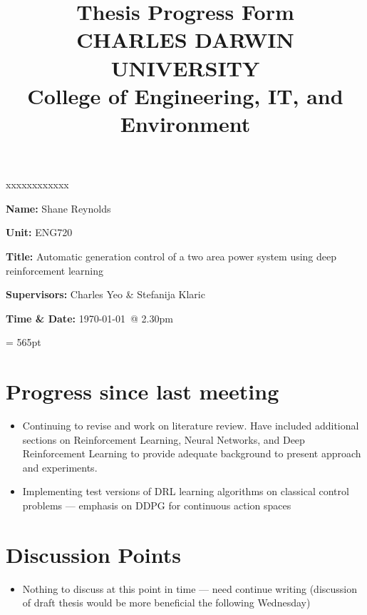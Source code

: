 \documentclass[12pt]{article}
\title{	
		Thesis Progress Form\\
		CHARLES DARWIN UNIVERSITY\\
		College of Engineering, IT, and Environment
	  }
\author{}
\date{}
\begin{document}
	
	\maketitle
	
	\begin{namelist}{xxxxxxxxxxxx}
		\item[{\bf Name:}]
			Shane Reynolds
		\item[{\bf Unit:}]
			ENG720
		\item[{\bf Title:}]
			Automatic generation control of a two area power system using deep reinforcement learning
		\item[{\bf Supervisors:}]
			Charles Yeo \& Stefanija Klaric
		\item[{\bf Time \& Date: }]
			\today \ @ 2.30pm
			
	\end{namelist}
	
	\pagestyle{plain} %
	\textheight = 565pt %
	
	\section{Progress since last meeting}
	\begin{itemize}
		\item Continuing to revise and work on literature review. Have included additional sections on Reinforcement Learning, Neural Networks, and Deep Reinforcement Learning to provide adequate background to present approach and experiments.
		\item Implementing test versions of DRL learning algorithms on classical control problems --- emphasis on DDPG for continuous action spaces
	\end{itemize}
	
	\section{Discussion Points}
	\begin{itemize}
		\item Nothing to discuss at this point in time --- need continue writing (discussion of draft thesis would be more beneficial the following Wednesday)
	\end{itemize}
	
\end{document}
